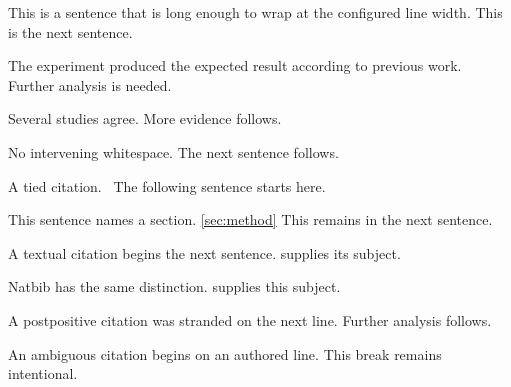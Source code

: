 This is a sentence that is long enough to wrap at the configured line width. \cite{Smith}
This is the next sentence.

The experiment produced the expected result according to previous work. \parencite[see][p.~5]{Jones}
Further analysis is needed.

Several studies agree. \citep{Alpha} \parencite{Beta} \autocite{Gamma}
More evidence follows.

No intervening whitespace.\cite{Gamma}
The next sentence follows.

A tied citation.~\cite{Tied}
The following sentence starts here.

This sentence names a section.
\ref{sec:method} This remains in the next sentence.

A textual citation begins the next sentence.
\textcite{Delta} supplies its subject.

Natbib has the same distinction.
\citet{Epsilon} supplies this subject.

A postpositive citation was stranded on the next line. \parencite{Zeta}
Further analysis follows.

An ambiguous citation begins on an authored line.
\cite{Eta} This break remains intentional.
